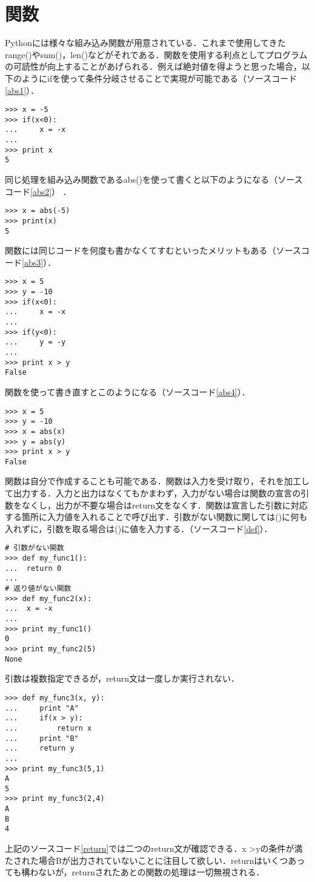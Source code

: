 \section{関数}
Pythonには様々な組み込み関数が用意されている．これまで使用してきたrange()やsum()，len()などがそれである．関数を使用する利点としてプログラムの可読性が向上することがあげられる．例えば絶対値を得ようと思った場合，以下のようにifを使って条件分岐させることで実現が可能である（ソースコード\ref{abs1}）．
\begin{lstlisting}[caption=絶対値に変換するコード, label=abs1]
>>> x = -5
>>> if(x<0):
...     x = -x
...
>>> print x
5
\end{lstlisting}
同じ処理を組み込み関数であるabs()を使って書くと以下のようになる（ソースコード\ref{abs2}） ．
\begin{lstlisting}[caption=abs(), label=abs2]
>>> x = abs(-5)
>>> print(x)
5
\end{lstlisting}
関数には同じコードを何度も書かなくてすむといったメリットもある（ソースコード\ref{abs3}）．
\begin{lstlisting}[caption=絶対値に変換するコードを使った場合, label=abs3]
>>> x = 5
>>> y = -10
>>> if(x<0):
... 	x = -x
...
>>> if(y<0):
... 	y = -y
...
>>> print x > y 
False
\end{lstlisting}
関数を使って書き直すとこのようになる（ソースコード\ref{abs4}）．
\begin{lstlisting}[caption=abs()を使った場合, label=abs4]
>>> x = 5
>>> y = -10
>>> x = abs(x)
>>> y = abs(y)
>>> print x > y
False
\end{lstlisting}
関数は自分で作成することも可能である．関数は入力を受け取り，それを加工して出力する．入力と出力はなくてもかまわず，入力がない場合は関数の宣言の引数をなくし，出力が不要な場合はreturn文をなくす．関数は宣言した引数に対応する箇所に入力値を入れることで呼び出す．引数がない関数に関しては()に何も入れずに，引数を取る場合は()に値を入力する．（ソースコード\ref{def}）．
\begin{lstlisting}[caption=関数の作成, label=def]
# 引数がない関数
>>> def my_func1():
...	 return 0
...
# 返り値がない関数
>>> def my_func2(x):
...	 x = -x
...  
>>> print my_func1()
0
>>> print my_func2(5)
None
\end{lstlisting}
引数は複数指定できるが，return文は一度しか実行されない．
\begin{lstlisting}[caption=returnの動作, label=return]
>>> def my_func3(x, y):
...     print "A"
...     if(x > y):
...         return x
...     print "B"
...     return y
...
>>> print my_func3(5,1)
A
5
>>> print my_func3(2,4)
A
B
4
\end{lstlisting}
上記のソースコード\ref{return}では二つのreturn文が確認できる．x \textgreater yの条件が満たされた場合Bが出力されていないことに注目して欲しい．returnはいくつあっても構わないが，returnされたあとの関数の処理は一切無視される．


